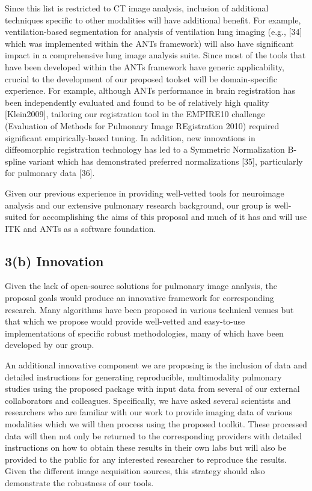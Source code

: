 \documentclass[11pt,]{article}
\begin{document}
Since this list is restricted to CT image analysis, inclusion of
additional techniques specific to other modalities will have additional
benefit. For example, ventilation-based segmentation for analysis of
ventilation lung imaging (e.g., {[}34{]} which was implemented within
the ANTs framework) will also have significant impact in a comprehensive
lung image analysis suite. Since most of the tools that have been
developed within the ANTs framework have generic applicability, crucial
to the development of our proposed toolset will be domain-specific
experience. For example, although ANTs performance in brain registration
has been independently evaluated and found to be of relatively high
quality {[}Klein2009{]}, tailoring our registration tool in the EMPIRE10
challenge (Evaluation of Methods for Pulmonary Image REgistration 2010)
required significant empirically-based tuning. In addition, new
innovations in diffeomorphic registration technology has led to a
Symmetric Normalization B-spline variant which has demonstrated
preferred normalizations {[}35{]}, particularly for pulmonary data
{[}36{]}.

Given our previous experience in providing well-vetted tools for
neuroimage analysis and our extensive pulmonary research background, our
group is well-suited for accomplishing the aims of this proposal and
much of it has and will use ITK and ANTs as a software foundation.

\subsection{\textbf{3(b) Innovation}}\label{b-innovation}

Given the lack of open-source solutions for pulmonary image analysis,
the proposal goals would produce an innovative framework for
corresponding research. Many algorithms have been proposed in various
technical venues but that which we propose would provide well-vetted and
easy-to-use implementations of specific robust methodologies, many of
which have been developed by our group.

An additional innovative component we are proposing is the inclusion of
data and detailed instructions for generating reproducible,
multimodality pulmonary studies using the proposed package with input
data from several of our external collaborators and colleagues.
Specifically, we have asked several scientists and researchers who are
familiar with our work to provide imaging data of various modalities
which we will then process using the proposed toolkit. These processed
data will then not only be returned to the corresponding providers with
detailed instructions on how to obtain these results in their own labs
but will also be provided to the public for any interested researcher to
reproduce the results. Given the different image acquisition sources,
this strategy should also demonstrate the robustness of our tools.
\end{document}
